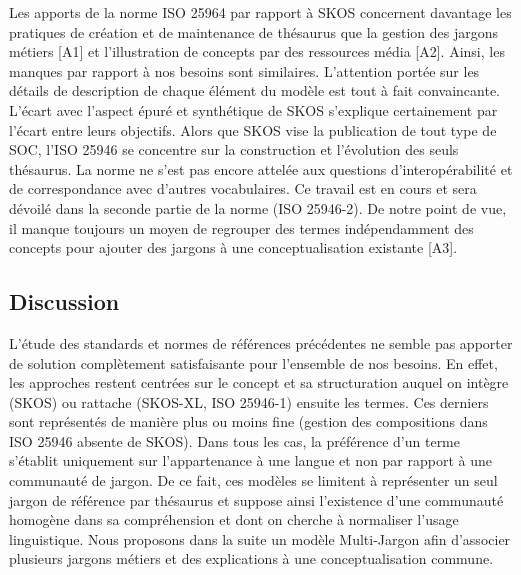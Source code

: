 Les apports de la norme ISO 25964 par rapport à SKOS concernent davantage les pratiques de création et de maintenance de thésaurus que la gestion des jargons métiers [A1] et l'illustration de concepts par des ressources média [A2]. 
Ainsi, les manques par rapport à nos besoins sont similaires. L'attention portée sur les détails de description de chaque élément du modèle est tout à fait convaincante. 
L'écart avec l'aspect épuré et synthétique de SKOS s'explique certainement par l'écart entre leurs objectifs. 
Alors que SKOS vise la publication de tout type de SOC, l'ISO 25946 se concentre sur la construction et l'évolution des seuls thésaurus. 
La norme ne s'est pas encore attelée aux questions d'interopérabilité et de correspondance avec d'autres vocabulaires. Ce travail est en cours et sera dévoilé dans la seconde partie de la norme (ISO 25946-2). 
De notre point de vue, il manque toujours un moyen de regrouper des termes indépendamment des concepts pour ajouter des jargons à une conceptualisation existante [A3].





\subsection*{Discussion}
L'étude des standards et normes de références précédentes ne semble pas apporter de solution complètement satisfaisante pour l'ensemble de nos besoins. 
En effet, les approches restent centrées sur le concept et sa structuration auquel on intègre (SKOS) ou rattache (SKOS-XL, ISO 25946-1) ensuite les termes. 
Ces derniers sont représentés de manière plus ou moins fine (gestion des compositions dans ISO 25946 absente de SKOS). 
Dans tous les cas, la préférence d'un terme s'établit uniquement sur l'appartenance à une langue et non par rapport à une communauté de jargon. %
De ce fait, ces modèles se limitent à représenter un seul jargon de référence par thésaurus et suppose ainsi l'existence d'une communauté homogène dans sa compréhension et dont on cherche à normaliser l'usage linguistique. %
Nous proposons dans la suite un modèle Multi-Jargon afin d'associer plusieurs jargons métiers et des explications à une conceptualisation commune. %